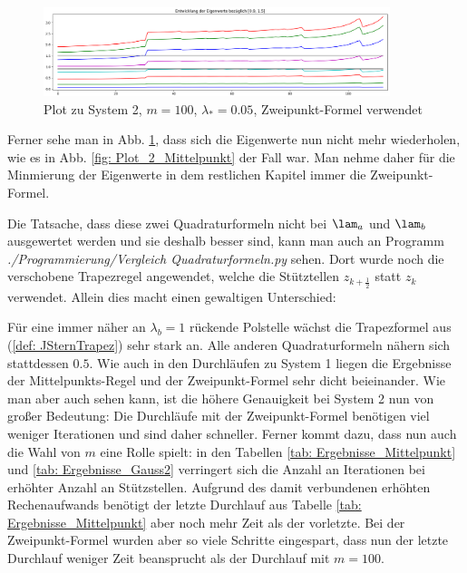 \documentclass[a4paper,12pt]{report}
\newcommand{\1}{\mathds{1}}
\theoremstyle{plain} %
\theoremstyle{definition} %
\theoremstyle{remark}
\begin{document}
            \begin{figure}[h!t]
                  \centering
                  \includegraphics[width=0.9\textwidth, keepaspectratio]{./Gauss2/Plot_2_100_0.05.png}
                  \caption[Plot zu System 2, $m=100$, $\lambda_*=0.05$, Zweipunkt-Formel]{Plot zu System 2, $m=100$, $\lambda_*=0.05$, Zweipunkt-Formel verwendet}
                  \label{fig: Plot_2_150_0.05_Gauss2}
            \end{figure}

            Ferner sehe man in Abb. \ref{fig: Plot_2_150_0.05_Gauss2}, dass sich die Eigenwerte nun nicht mehr wiederholen,
            wie es in Abb. \ref{fig: Plot_2_Mittelpunkt} der Fall war.
            Man nehme daher für die Minmierung der Eigenwerte in dem restlichen Kapitel immer die Zweipunkt-Formel.

            Die Tatsache, dass diese zwei Quadraturformeln nicht bei $\lam_a$ und $\lam_b$ ausgewertet werden und sie deshalb besser sind,
            kann man auch an Programm \textit{./Programmierung/Vergleich Quadraturformeln.py} sehen.
            Dort wurde noch die verschobene Trapezregel angewendet, welche die Stütztellen $z_{k+\frac 1 2}$ statt $z_k$ verwendet.
            Allein dies macht einen gewaltigen Unterschied:

            Für eine immer näher an $\lambda_b = 1$ rückende Polstelle wächst die Trapezformel aus (\ref{def: JSternTrapez}) sehr stark an.
            Alle anderen Quadraturformeln nähern sich stattdessen $0.5$.
            Wie auch in den Durchläufen zu System 1 liegen die Ergebnisse der Mittelpunkts-Regel und der Zweipunkt-Formel sehr dicht beieinander.
            Wie man aber auch sehen kann, ist die höhere Genauigkeit bei System 2 nun von großer Bedeutung:
            Die Durchläufe mit der Zweipunkt-Formel benötigen viel weniger Iterationen und sind daher schneller.
            Ferner kommt dazu, dass nun auch die Wahl von $m$ eine Rolle spielt: in den Tabellen \ref{tab: Ergebnisse_Mittelpunkt} 
            und \ref{tab: Ergebnisse_Gauss2} verringert sich die Anzahl an Iterationen bei erhöhter Anzahl an Stützstellen.
            Aufgrund des damit verbundenen erhöhten Rechenaufwands benötigt der letzte Durchlauf aus Tabelle \ref{tab: Ergebnisse_Mittelpunkt} aber noch mehr Zeit als der vorletzte.
            Bei der Zweipunkt-Formel wurden aber so viele Schritte eingespart, dass nun der letzte Durchlauf weniger Zeit beansprucht als der Durchlauf mit $m=100$.
\end{document}
